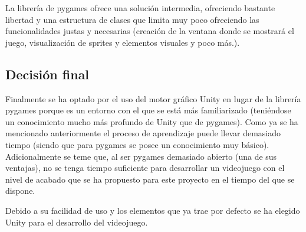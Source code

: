 La librería de pygames ofrece una solución intermedia, ofreciendo bastante libertad y una estructura de clases que limita muy poco ofreciendo las funcionalidades justas y necesarias (creación de la ventana donde se mostrará el juego, visualización de sprites y elementos visuales y poco más.).

\subsection{Decisión final}
Finalmente se ha optado por el uso del motor gráfico Unity en lugar de la librería pygames porque es un entorno con el que se está más familiarizado (teniéndose un conocimiento mucho más profundo de Unity que de pygames). Como ya se ha mencionado anteriormente el proceso de aprendizaje puede llevar demasiado tiempo (siendo que para pygames se posee un conocimiento muy básico). Adicionalmente se teme que, al ser pygames demasiado abierto (una de sus ventajas), no se tenga tiempo suficiente para desarrollar un videojuego con el nivel de acabado que se ha propuesto para este proyecto en el tiempo del que se dispone.

Debido a su facilidad de uso y los elementos que ya trae por defecto se ha elegido Unity para el desarrollo del videojuego.

